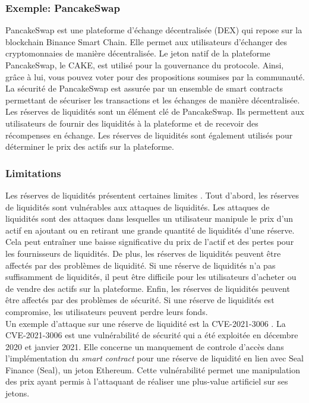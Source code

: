 \subsubsection{Exemple: PancakeSwap}
PancakeSwap est une plateforme d’échange décentralisée (DEX) qui repose sur la \gls{blockchain} Binance Smart Chain. \cite{augustin2022yield} Elle permet aux utilisateurs d’échanger des 
cryptomonnaies de manière décentralisée. Le jeton natif de la plateforme PancakeSwap, le CAKE, est utilisé 
pour la gouvernance du protocole. Ainsi, grâce à lui, vous pouvez voter pour des propositions soumises par la communauté. La sécurité de PancakeSwap est assurée 
par un ensemble de smart contracts permettant de sécuriser les transactions et les échanges de manière décentralisée. Les réserves de liquidités sont un 
élément clé de PancakeSwap. Ils permettent aux utilisateurs de fournir des liquidités à la plateforme et de recevoir des récompenses en échange. Les réserves 
de liquidités sont également utilisés pour déterminer le prix des actifs sur la plateforme.

\subsubsection{Limitations}
Les réserves de liquidités présentent certaines limites \cite{caldarelli2021blockchain}. Tout d’abord, les réserves de liquidités sont vulnérables aux attaques de liquidités. Les attaques 
de liquidités sont des attaques dans lesquelles un utilisateur manipule le prix d’un actif en ajoutant ou en retirant une grande quantité de liquidités d’une 
réserve. Cela peut entraîner une baisse significative du prix de l’actif et des pertes pour les fournisseurs de liquidités. De plus, les réserves de liquidités 
peuvent être affectés par des problèmes de liquidité. Si une réserve de liquidités n’a pas suffisamment de liquidités, il peut être difficile pour les 
utilisateurs d’acheter ou de vendre des actifs sur la plateforme. Enfin, les réserves de liquidités peuvent être affectés par des problèmes de sécurité. Si 
une réserve de liquidités est compromise, les utilisateurs peuvent perdre leurs fonds. \\
Un exemple d'attaque sur une réserve de liquidité est la CVE-2021-3006 \cite{nvd2021-3006,blocksec2021Seal}. La CVE-2021-3006 est une vulnérabilité de sécurité qui a été exploitée en décembre 
2020 et janvier 2021. Elle concerne un manquement de controle d'accès dans l’implémentation du \textit{\gls{smart contract}} pour une réserve de liquidité en lien avec 
Seal Finance (Seal), un jeton Ethereum. Cette vulnérabilité permet une manipulation des prix ayant permis à l'attaquant de réaliser une plus-value artificiel 
sur ses jetons.